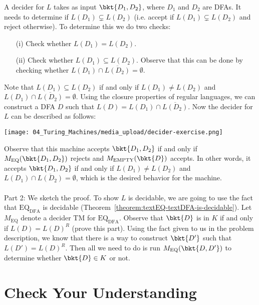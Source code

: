 \begin{flex}
\begin{solution}
A decider for $L$ takes as input $\bkt{D_1,D_2}$, where $D_1$ and $D_2$ are DFAs. It needs to determine if $L(D_1) \subsetneq L(D_2)$ (i.e. accept if $L(D_1) \subsetneq L(D_2)$ and reject otherwise). To determine this we do two checks:
\begin{enumerate}
    \item[(i)] Check whether $L(D_1) = L(D_2)$.
    \item[(ii)] Check whether $L(D_1) \subseteq L(D_2)$. Observe that this can be done by checking whether $L(D_1) \cap \overline{L(D_2)} = \emptyset$.
\end{enumerate}
Note that $L(D_1) \subseteq L(D_2)$ if and only if $L(D_1) \neq L(D_2)$ and $L(D_1) \cap \overline{L(D_2)} = \emptyset$. Using the closure properties of regular languages, we can construct a DFA $D$ such that $L(D) = L(D_1) \cap \overline{L(D_2)}$. Now the decider for $L$ can be described as follows:
\begin{center}
    \texttt{[image: 04\_Turing\_Machines/media\_upload/decider-exercise.png]}
\end{center}
Observe that this machine accepts $\bkt{D_1,D_2}$ if and only if  $M_\text{EQ}(\bkt{D_1,D_2})$ rejects and $M_\text{EMPTY}(\bkt{D})$ accepts. In other words, it accepts $\bkt{D_1,D_2}$ if and only if $L(D_1) \neq L(D_2)$ and $L(D_1) \cap \overline{L(D_2)} = \emptyset$, which is the desired behavior for the machine.
\\\\
\noindent
Part 2: We sketch the proof. To show $L$ is decidable, we are going to use the fact that $\mathrm{EQ}_\mathrm{DFA}$ is decidable (Theorem~\ref{theorem:textEQ-textDFA-is-decidable}). Let $M_\text{EQ}$ denote a decider TM for $\mathrm{EQ}_\mathrm{DFA}$. Observe that $\bkt{D}$ is in $K$ if and only if $L(D) = L(D)^R$ (prove this part). Using the fact given to us in the problem description, we know that there is a way to construct $\bkt{D'}$ such that $L(D') = L(D)^R$. Then all we need to do is run $M_\text{EQ}(\bkt{D, D'})$ to determine whether $\bkt{D} \in K$ or not.
\end{solution}
\end{flex}




\section{Check Your Understanding}

